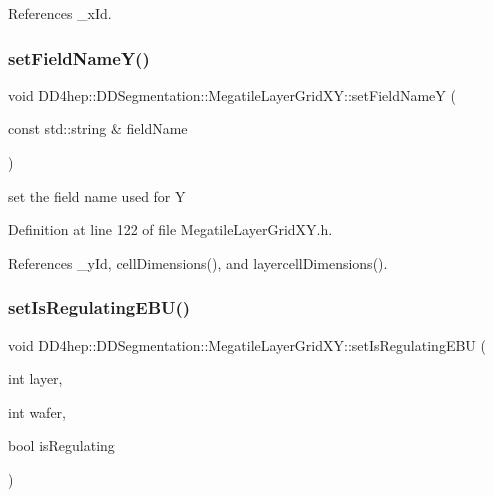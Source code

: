 References \+\_\+x\+Id.

\hypertarget{class_d_d4hep_1_1_d_d_segmentation_1_1_megatile_layer_grid_x_y_a19e5ddea2f004ff1b991f16cff99648b}{}\label{class_d_d4hep_1_1_d_d_segmentation_1_1_megatile_layer_grid_x_y_a19e5ddea2f004ff1b991f16cff99648b} 
\subsubsection{\texorpdfstring{set\+Field\+Name\+Y()}{setFieldNameY()}}
{\footnotesize\ttfamily void D\+D4hep\+::\+D\+D\+Segmentation\+::\+Megatile\+Layer\+Grid\+X\+Y\+::set\+Field\+NameY (\begin{DoxyParamCaption}\item[{const std\+::string \&}]{field\+Name }\end{DoxyParamCaption})\hspace{0.3cm}{\ttfamily [inline]}}



set the field name used for Y 



Definition at line 122 of file Megatile\+Layer\+Grid\+X\+Y.\+h.



References \+\_\+y\+Id, cell\+Dimensions(), and layercell\+Dimensions().

\hypertarget{class_d_d4hep_1_1_d_d_segmentation_1_1_megatile_layer_grid_x_y_a7d696e7cba091370935d23b62c79ae9c}{}\label{class_d_d4hep_1_1_d_d_segmentation_1_1_megatile_layer_grid_x_y_a7d696e7cba091370935d23b62c79ae9c} 
\subsubsection{\texorpdfstring{set\+Is\+Regulating\+E\+B\+U()}{setIsRegulatingEBU()}}
{\footnotesize\ttfamily void D\+D4hep\+::\+D\+D\+Segmentation\+::\+Megatile\+Layer\+Grid\+X\+Y\+::set\+Is\+Regulating\+E\+BU (\begin{DoxyParamCaption}\item[{int}]{layer,  }\item[{int}]{wafer,  }\item[{bool}]{is\+Regulating }\end{DoxyParamCaption})\hspace{0.3cm}{\ttfamily [inline]}}




